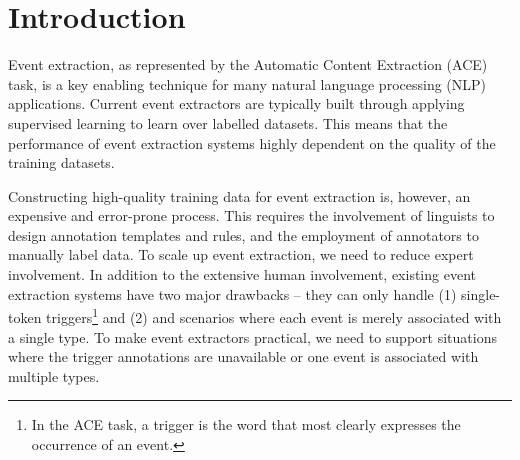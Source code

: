 \section{Introduction}
%

Event extraction, as represented by the Automatic Content Extraction (ACE) task, is a key enabling
technique for many natural language processing (NLP) applications.  Current event extractors are typically built through applying supervised learning to learn over labelled datasets. This means that the performance of event extraction systems highly dependent on the quality of the training datasets.

Constructing high-quality training data for event extraction is, however, an expensive and error-prone process\FIXME{\cite{}}. This requires the involvement of linguists to design annotation templates and rules, and the employment of annotators to manually label data. To scale up event extraction, we need to reduce expert involvement.
In addition to the extensive human involvement, existing event extraction systems have two major drawbacks -- they can only handle (1)  single-token triggers\footnote{In the ACE task, a trigger is the word that most clearly expresses the occurrence of an event.} and (2) and scenarios where  each event is merely associated with a single type.
To make event extractors practical, we need to support situations where the trigger annotations are unavailable or one event is associated with multiple types.


